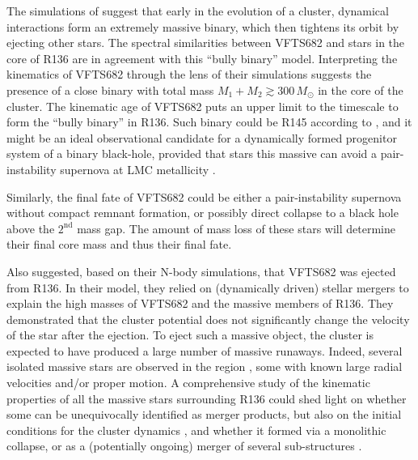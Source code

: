 \documentclass[apjl,twocolumn]{emulateapj}
\DeclareRobustCommand{\Figref}[1]{Fig.~\ref{#1}}
\begin{document}
The simulations of \cite{fujii:11} suggest that
early in the evolution of a cluster, dynamical interactions form an extremely
massive binary, which then tightens its orbit by ejecting other
stars. The spectral similarities between VFTS682 and stars in the core
of R136 are in agreement with this ``bully binary'' model. Interpreting the kinematics of VFTS682 through the lens of their simulations
suggests the presence of a close binary with total mass
$M_1+M_2\gtrsim 300\,M_\odot$ in the core of the cluster. The kinematic age of VFTS682 puts an
upper limit to the timescale to form the ``bully binary'' in
R136. Such binary could be R145 according to \cite{fujii:11}, and it might be an
ideal observational candidate for a dynamically formed progenitor system of
a binary black-hole, provided that stars this massive can avoid a
pair-instability supernova \cite[e.g.,][]{rakavy:67} at LMC
metallicity \citep[see also][]{langer:07}.

Similarly, the final fate of VFTS682 could be either a
pair-instability supernova without compact remnant formation, or
possibly direct collapse to a black hole above the $2^\mathrm{nd}$
mass gap. The amount of mass loss of these stars will determine their final core
mass and thus their final fate.

Also \citet{banerjee:12} suggested, based on their N-body simulations,
that VFTS682 was ejected from R136. In their
model, they relied on (dynamically driven) stellar mergers to explain the high masses of
VFTS682 and the massive members of R136. They
demonstrated that the cluster potential does not significantly change
the velocity of the star after the ejection.
To eject such a massive object, the cluster is
expected to have produced
a large number of massive runaways. Indeed, several %
isolated massive stars are observed in the region \citep[][]{evans:10,lennon:18}, some with known
large radial velocities and/or proper motion. %
A comprehensive study of the kinematic
properties of all the massive stars surrounding R136 could shed light
on whether some can be unequivocally identified as merger products,
but also on the initial conditions for the cluster dynamics
\citep[e.g.,][]{oh:16}, and whether it formed via a monolithic collapse, or
as a (potentially ongoing) merger of several sub-structures \citep[e.g.,][]{sabbi:12}.
\end{document}
